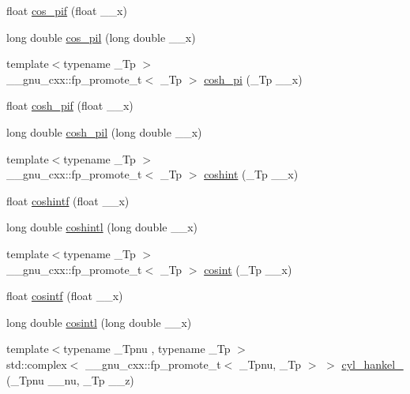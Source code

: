 \begin{DoxyCompactItemize}
float \hyperlink{group__mathsf__gnu_gaddcae99c1572af6fa1d79b9cfa053033}{cos\+\_\+pif} (float \+\_\+\+\_\+x)
\item 
long double \hyperlink{group__mathsf__gnu_ga9b6816c0abf30fd88417d79a33cb5465}{cos\+\_\+pil} (long double \+\_\+\+\_\+x)
\item 
{\footnotesize template$<$typename \+\_\+\+Tp $>$ }\\\+\_\+\+\_\+gnu\+\_\+cxx\+::fp\+\_\+promote\+\_\+t$<$ \+\_\+\+Tp $>$ \hyperlink{group__mathsf__gnu_gaf59c68a01adfdab0f22c4fb405ab2a36}{cosh\+\_\+pi} (\+\_\+\+Tp \+\_\+\+\_\+x)
\item 
float \hyperlink{group__mathsf__gnu_ga79a2f5c9da96b5ea6c663d6efca24944}{cosh\+\_\+pif} (float \+\_\+\+\_\+x)
\item 
long double \hyperlink{group__mathsf__gnu_gab7bf4f591dd35af2bdb88a8219f5e248}{cosh\+\_\+pil} (long double \+\_\+\+\_\+x)
\item 
{\footnotesize template$<$typename \+\_\+\+Tp $>$ }\\\+\_\+\+\_\+gnu\+\_\+cxx\+::fp\+\_\+promote\+\_\+t$<$ \+\_\+\+Tp $>$ \hyperlink{group__mathsf__gnu_ga2411d513d418180285ace6650c7b7e31}{coshint} (\+\_\+\+Tp \+\_\+\+\_\+x)
\item 
float \hyperlink{group__mathsf__gnu_ga1af4d48209169967a836bd97e625a128}{coshintf} (float \+\_\+\+\_\+x)
\item 
long double \hyperlink{group__mathsf__gnu_ga6d24ab53fad13d421f07d9a9a509de14}{coshintl} (long double \+\_\+\+\_\+x)
\item 
{\footnotesize template$<$typename \+\_\+\+Tp $>$ }\\\+\_\+\+\_\+gnu\+\_\+cxx\+::fp\+\_\+promote\+\_\+t$<$ \+\_\+\+Tp $>$ \hyperlink{group__mathsf__gnu_gafd398869cde057087e6b3428a1d13a93}{cosint} (\+\_\+\+Tp \+\_\+\+\_\+x)
\item 
float \hyperlink{group__mathsf__gnu_ga87202351dc97d2c69e42bf58f911fb5a}{cosintf} (float \+\_\+\+\_\+x)
\item 
long double \hyperlink{group__mathsf__gnu_ga5f01f17ae8859129860118b09d51791c}{cosintl} (long double \+\_\+\+\_\+x)
\item 
{\footnotesize template$<$typename \+\_\+\+Tpnu , typename \+\_\+\+Tp $>$ }\\std\+::complex$<$ \+\_\+\+\_\+gnu\+\_\+cxx\+::fp\+\_\+promote\+\_\+t$<$ \+\_\+\+Tpnu, \+\_\+\+Tp $>$ $>$ \hyperlink{group__mathsf__gnu_ga5329bba77d10a9d2f15d9bbe43a70db3}{cyl\+\_\+hankel\+\_} (\+\_\+\+Tpnu \+\_\+\+\_\+nu, \+\_\+\+Tp \+\_\+\+\_\+z)
\item 

\end{DoxyCompactItemize}
